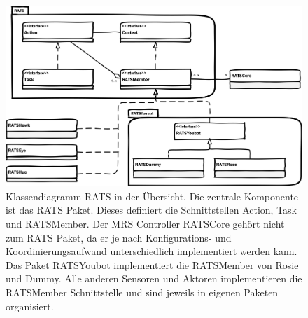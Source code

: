 \begin{figure}
	\centering
	\includegraphics[scale=0.5]{fig/classrats}
	\caption[Klassenübersicht RATS]{Klassendiagramm RATS in der Übersicht. Die zentrale Komponente ist das RATS Paket. Dieses definiert die Schnittstellen Action, Task und RATSMember. Der MRS Controller RATSCore gehört nicht zum RATS Paket, da er je nach Konfigurations- und Koordinierungsaufwand unterschiedlich implementiert werden kann. Das Paket RATSYoubot implementiert die RATSMember von Rosie und Dummy. Alle anderen Sensoren und Aktoren implementieren die RATSMember Schnittstelle und sind jeweils in eigenen Paketen organisiert.}
	\label{fig:classrats}
\end{figure}


